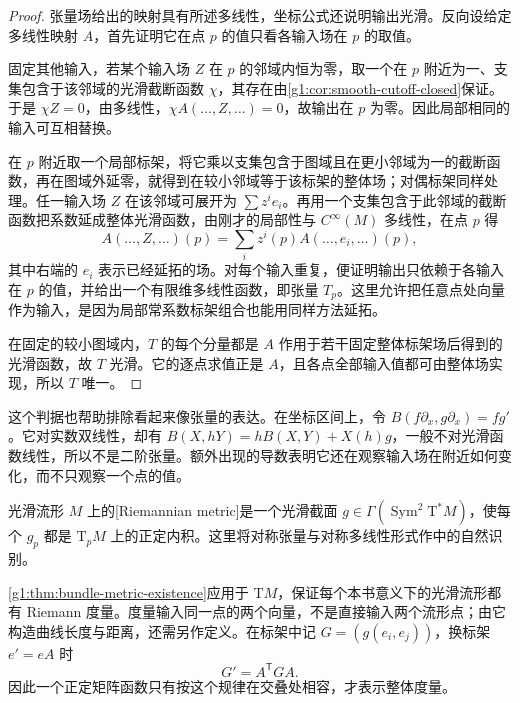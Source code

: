 \begin{proof}
	张量场给出的映射具有所述多线性，坐标公式还说明输出光滑。反向设给定多线性映射 \(A\)，首先证明它在点 \(p\) 的值只看各输入场在 \(p\) 的取值。

	固定其他输入，若某个输入场 \(Z\) 在 \(p\) 的邻域内恒为零，取一个在 \(p\) 附近为一、支集包含于该邻域的光滑截断函数 \(\chi\)，其存在由\cref{g1:cor:smooth-cutoff-closed}保证。于是 \(\chi Z=0\)，由多线性，\(\chi A(\ldots,Z,\ldots)=0\)，故输出在 \(p\) 为零。因此局部相同的输入可互相替换。

	在 \(p\) 附近取一个局部标架，将它乘以支集包含于图域且在更小邻域为一的截断函数，再在图域外延零，就得到在较小邻域等于该标架的整体场；对偶标架同样处理。任一输入场 \(Z\) 在该邻域可展开为 \(\sum z^i e_i\)。再用一个支集包含于此邻域的截断函数把系数延成整体光滑函数，由刚才的局部性与 \(C^\infty(M)\) 多线性，在点 \(p\) 得
	\[
		A(\ldots,Z,\ldots)(p)=\sum_i z^i(p)A(\ldots,e_i,\ldots)(p),
	\]
	其中右端的 \(e_i\) 表示已经延拓的场。对每个输入重复，便证明输出只依赖于各输入在 \(p\) 的值，并给出一个有限维多线性函数，即张量 \(T_p\)。这里允许把任意点处向量作为输入，是因为局部常系数标架组合也能用同样方法延拓。

	在固定的较小图域内，\(T\) 的每个分量都是 \(A\) 作用于若干固定整体标架场后得到的光滑函数，故 \(T\) 光滑。它的逐点求值正是 \(A\)，且各点全部输入值都可由整体场实现，所以 \(T\) 唯一。
\end{proof}

这个判据也帮助排除看起来像张量的表达。在坐标区间上，令 \(B(f\partial_x,g\partial_x)=f g'\)。它对实数双线性，却有 \(B(X,hY)=hB(X,Y)+X(h)g\)，一般不对光滑函数线性，所以不是二阶张量。额外出现的导数表明它还在观察输入场在附近如何变化，而不只观察一个点的值。

\begin{definition}
	\label{g1:def:riemannian-metric-tensor}
	光滑流形 \(M\) 上的[Riemannian metric]是一个光滑截面 \(g\in\Gamma(\operatorname{Sym}^2\mathrm{T}^*M)\)，使每个 \(g_p\) 都是 \(\mathrm{T}_pM\) 上的正定内积。这里将对称张量与对称多线性形式作中的自然识别。
\end{definition}

\cref{g1:thm:bundle-metric-existence}应用于 \(\mathrm{T}M\)，保证每个本书意义下的光滑流形都有 Riemann 度量。度量输入同一点的两个向量，不是直接输入两个流形点；由它构造曲线长度与距离，还需另作定义。在标架中记 \(G=(g(e_i,e_j))\)，换标架 \(e'=eA\) 时
\[
	G'=A^{\mathsf T}GA.
\]
因此一个正定矩阵函数只有按这个规律在交叠处相容，才表示整体度量。

